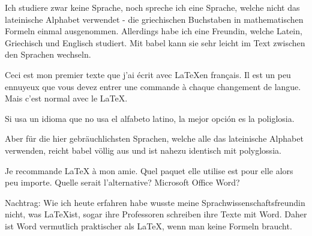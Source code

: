 \documentclass{scrartcl}
\begin{document}
Ich studiere zwar keine Sprache, noch spreche ich eine Sprache, welche nicht das lateinische Alphabet verwendet - die griechischen Buchstaben in mathematischen Formeln einmal ausgenommen. Allerdings habe ich eine Freundin, welche Latein, Griechisch und Englisch studiert. Mit babel kann sie sehr leicht im Text zwischen den Sprachen wechseln.

Ceci est mon premier texte que j'ai écrit avec \LaTeX  en français. Il est un peu ennuyeux que vous devez entrer une commande à chaque changement de langue. Mais c'est normal avec le \LaTeX.

Si usa un idioma que no usa el alfabeto latino, la mejor opción es la poliglosia.

Aber für die hier gebräuchlichsten Sprachen, welche alle das lateinische Alphabet verwenden, reicht babel völlig aus und ist nahezu identisch mit polyglossia.

Je recommande LaTeX à mon amie. Quel paquet elle utilise est pour elle alors peu importe. Quelle serait l'alternative? Microsoft Office Word?

Nachtrag: Wie ich heute erfahren habe wusste meine Sprachwissenschaftsfreundin nicht, was \LaTeX ist, sogar ihre Professoren schreiben ihre Texte mit Word. Daher ist Word vermutlich praktischer als \LaTeX, wenn man keine Formeln braucht.
\end{document}
